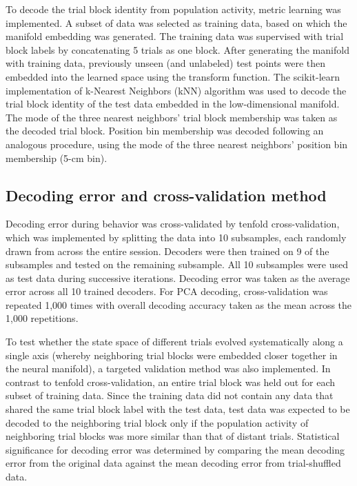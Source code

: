 To decode the trial block identity from population activity, metric learning was implemented. A subset of data was selected as training data, based on which the manifold embedding was generated. The training data was supervised with trial block labels by concatenating 5 trials as one block. After generating the manifold with training data, previously unseen (and unlabeled) test points were then embedded into the learned space using the transform function. The scikit-learn implementation of k-Nearest Neighbors (kNN) algorithm was used to decode the trial block identity of the test data embedded in the low-dimensional manifold. The mode of the three nearest neighbors' trial block membership was taken as the decoded trial block. Position bin membership was decoded following an analogous procedure, using the mode of the three nearest neighbors' position bin membership (5-cm bin).

\subsection{Decoding error and cross-validation method}

Decoding error during behavior was cross-validated by tenfold cross-validation, which was implemented by splitting the data into 10 subsamples, each randomly drawn from across the entire session. Decoders were then trained on 9 of the subsamples and tested on the remaining subsample. All 10 subsamples were used as test data during successive iterations. Decoding error was taken as the average error across all 10 trained decoders. For PCA decoding, cross-validation was repeated 1,000 times with overall decoding accuracy taken as the mean across the 1,000 repetitions.

To test whether the state space of different trials evolved systematically along a single axis (whereby neighboring trial blocks were embedded closer together in the neural manifold), a targeted validation method was also implemented. In contrast to tenfold cross-validation, an entire trial block was held out for each subset of training data. Since the training data did not contain any data that shared the same trial block label with the test data, test data was expected to be decoded to the neighboring trial block only if the population activity of neighboring trial blocks was more similar than that of distant trials. Statistical significance for decoding error was determined by comparing the mean decoding error from the original data against the mean decoding error from trial-shuffled data.


